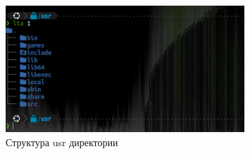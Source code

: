 \newpage

\begin{figure}[!h]
    \centering
    \includegraphics[width = 0.8\textwidth]{images/usrDir.png}
    
    \caption{Структура usr директории}
    
    \label{fig:usrDir}
\end{figure}
